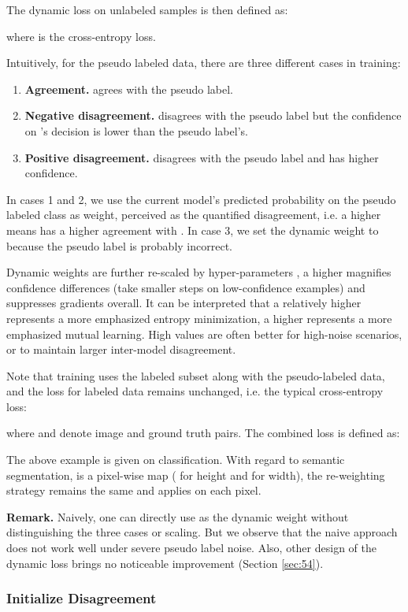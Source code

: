 \documentclass[preprint,review,10pt]{elsarticle}
\begin{document}
The dynamic loss on unlabeled samples  is then defined as:

where  is the cross-entropy loss.

Intuitively, for the pseudo labeled data, there are three different cases in training: 
\begin{enumerate}
    \item \textbf{Agreement.}  agrees with the pseudo label.
    \item \textbf{Negative disagreement.}  disagrees with the pseudo label but the confidence on 's decision is lower than the pseudo label's.
    \item \textbf{Positive disagreement.}  disagrees with the pseudo label and has higher confidence.
\end{enumerate}
In cases 1 and 2, we use the current model's predicted probability  on the pseudo labeled class as weight, perceived as the quantified disagreement, i.e. a higher  means  has a higher agreement with . In case 3, we set the dynamic weight to  because the pseudo label is probably incorrect.

Dynamic weights are further re-scaled by hyper-parameters , a higher  magnifies confidence differences (take smaller steps on low-confidence examples) and suppresses gradients overall. It can be interpreted that a relatively higher  represents a more emphasized entropy minimization, a higher  represents a more emphasized mutual learning. High  values are often better for high-noise scenarios, or to maintain larger inter-model disagreement.

Note that training uses the labeled subset along with the pseudo-labeled data, and the loss for labeled data  remains unchanged, i.e. the typical cross-entropy loss:

where  and  denote image and ground truth pairs. The combined loss  is defined as:


The above example is given on classification. With regard to semantic segmentation,  is a pixel-wise map ( for height and  for width), the re-weighting strategy remains the same and applies on each pixel.


\textbf{Remark.} Naively, one can directly use  as the dynamic weight without distinguishing the three cases or scaling. But we observe that the naive approach does not work well under severe pseudo label noise. Also, other design of the dynamic loss brings no noticeable improvement (Section \ref{sec:54}). 

\subsubsection{Initialize Disagreement}
\label{sec:412}
\end{document}
